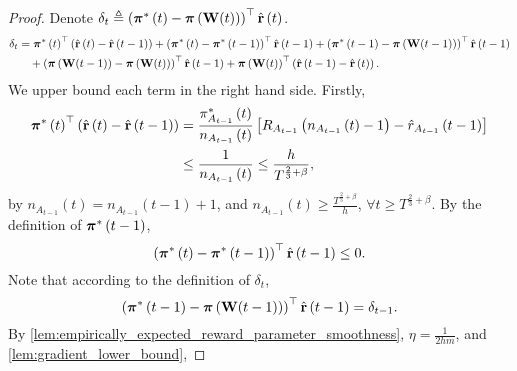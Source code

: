 \begin{proof}
    Denote $\delta_t \triangleq \left( {{\boldsymbol{\pi}}^*\left(t\right)} - {\boldsymbol{\pi}}\left( {\mathbf{W}}(t) \right) \right)^\top \hat{{\mathbf{r}}}\left(t\right)$.
\begin{equation}
\label{eq:dynamic_regret_decomposition}
\begin{split}
    \delta_t &= {{\boldsymbol{\pi}}^*\left(t\right)}^\top \left( \hat{{\mathbf{r}}}\left(t\right) - \hat{{\mathbf{r}}}\left(t-1\right)\right) + \left( {{\boldsymbol{\pi}}^*\left(t\right)} - {{\boldsymbol{\pi}}^*\left(t-1\right)} \right)^\top \hat{{\mathbf{r}}} \left(t-1\right)  + \left( {{\boldsymbol{\pi}}^*\left(t-1\right)} - {\boldsymbol{\pi}}\left( {\mathbf{W}}(t-1) \right) \right)^\top \hat{{\mathbf{r}}}\left(t-1\right) \\
    &\quad + \left(  {\boldsymbol{\pi}}\left( {\mathbf{W}}(t-1) \right) - {\boldsymbol{\pi}}\left( {\mathbf{W}}(t) \right) 
    \right)^\top \hat{{\mathbf{r}}}\left(t-1\right) + {\boldsymbol{\pi}}\left( {\mathbf{W}}(t) \right)^\top \left( \hat{{\mathbf{r}}}\left(t-1\right) - \hat{{\mathbf{r}}}\left(t\right) \right).
\end{split}
\end{equation}
We upper bound each term in the right hand side. Firstly,
\begin{equation*}
\begin{split}
    {{\boldsymbol{\pi}}^*\left(t\right)}^\top \left( \hat{{\mathbf{r}}}\left(t\right) - \hat{{\mathbf{r}}}\left(t-1\right)\right) &= \frac{{\pi_{ A_{t-1}}^*\left(t\right)}}{n_{ A_{t-1}}\left(t\right)} \left[ R_{ A_{t-1}}\left( n_{ A_{t-1}}\left(t\right) -1 \right) - \hat{r}_{ A_{t-1}}\left(t-1\right) \right] \\
    &\le \frac{1}{n_{A_{t-1}}\left(t\right)} \le \frac{h}{T^{\frac{2}{3} + \beta}},
\end{split}
\end{equation*}
by $n_{A_{t-1}}\left(t\right) = n_{ A_{t-1}}\left(t-1\right) + 1$, and $n_{ A_{t-1}}\left(t\right) \ge \frac{T^{\frac{2}{3} + \beta}}{h}$, $\forall t \ge T^{\frac{2}{3} + \beta}$. By the definition of ${{\boldsymbol{\pi}}^*\left(t-1\right)}$,
\begin{equation*}
    \left( {{\boldsymbol{\pi}}^*\left(t\right)} - {{\boldsymbol{\pi}}^*\left(t-1\right)} \right)^\top \hat{{\mathbf{r}}}\left(t-1\right) \le 0.
\end{equation*}
Note that according to the definition of $\delta_t$,
\begin{equation*}
    \left( {{\boldsymbol{\pi}}^*\left(t-1\right)} - {\boldsymbol{\pi}}\left( {\mathbf{W}}(t-1) \right) \right)^\top \hat{{\mathbf{r}}}\left(t-1\right) = \delta_{t-1}.
\end{equation*}
By \cref{lem:empirically_expected_reward_parameter_smoothness}, $\eta = \frac{1}{2 h m}$, and \cref{lem:gradient_lower_bound},

\end{proof}
